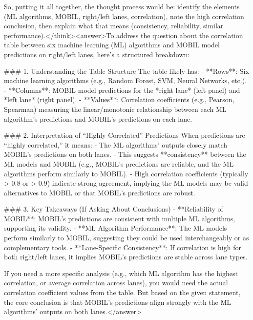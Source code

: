 So, putting it all together, the thought process would be: identify the elements (ML algorithms, MOBIL, right/left lanes, correlation), note the high correlation conclusion, then explain what that means (consistency, reliability, similar performance).</think><answer>To address the question about the correlation table between six machine learning (ML) algorithms and MOBIL model predictions on right/left lanes, here’s a structured breakdown:  


### 1. Understanding the Table Structure  
The table likely has:  
- **Rows**: Six machine learning algorithms (e.g., Random Forest, SVM, Neural Networks, etc.).  
- **Columns**: MOBIL model predictions for the *right lane* (left panel) and *left lane* (right panel).  
- **Values**: Correlation coefficients (e.g., Pearson, Spearman) measuring the linear/monotonic relationship between each ML algorithm’s predictions and MOBIL’s predictions on each lane.  


### 2. Interpretation of “Highly Correlated” Predictions  
When predictions are “highly correlated,” it means:  
- The ML algorithms’ outputs closely match MOBIL’s predictions on both lanes.  
- This suggests **consistency** between the ML models and MOBIL (e.g., MOBIL’s predictions are reliable, and the ML algorithms perform similarly to MOBIL).  
- High correlation coefficients (typically > 0.8 or > 0.9) indicate strong agreement, implying the ML models may be valid alternatives to MOBIL or that MOBIL’s predictions are robust.  


### 3. Key Takeaways (If Asking About Conclusions)  
- **Reliability of MOBIL**: MOBIL’s predictions are consistent with multiple ML algorithms, supporting its validity.  
- **ML Algorithm Performance**: The ML models perform similarly to MOBIL, suggesting they could be used interchangeably or as complementary tools.  
- **Lane-Specific Consistency**: If correlation is high for both right/left lanes, it implies MOBIL’s predictions are stable across lane types.  


If you need a more specific analysis (e.g., which ML algorithm has the highest correlation, or average correlation across lanes), you would need the actual correlation coefficient values from the table. But based on the given statement, the core conclusion is that MOBIL’s predictions align strongly with the ML algorithms’ outputs on both lanes.</answer>